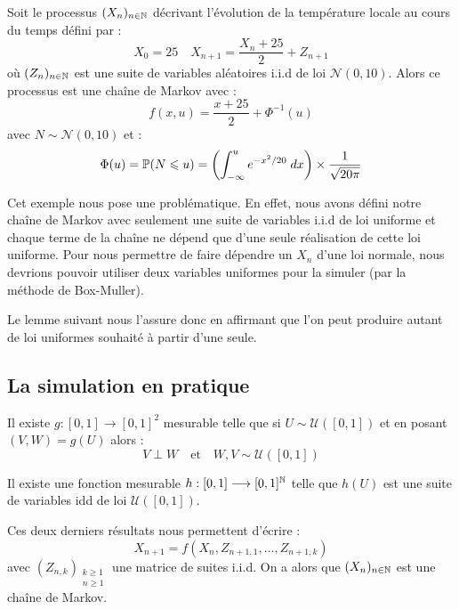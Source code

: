 \begin{example}
    Soit le processus $(X_n)_{n \in \mathbb{N}}$ décrivant l'évolution de la température locale au cours du temps défini par : 
        $$ X_0 = 25 \quad X_{n+1} = \frac{X_n + 25}{2} + Z_{n+1} $$
    où $(Z_n)_{n \in \mathbb{N}}$ est une suite de variables aléatoires i.i.d de loi $ \mathcal{N}(0, 10)$. 
    Alors ce processus est une chaîne de Markov avec : 
        $$ f(x,u) = \frac{x + 25}{2} + \Phi^{-1}(u) $$  
    avec $N \sim \mathcal{N}(0, 10)$ et : 
        \begin{align*}
            \Phi(u) = \mathbb{P}(N \leqslant u) = \left( \int_{- \infty}^{u} e^{- x^2 / 20} \; dx\right) \times \frac{1}{\sqrt{20 \pi}}   
        \end{align*}
\end{example}

\begin{remark}
    Cet exemple nous pose une problématique. En effet, nous avons défini notre chaîne de Markov avec seulement 
    une suite de variables i.i.d de loi uniforme et chaque terme de la chaîne ne dépend que d'une seule 
    réalisation de cette loi uniforme. Pour nous permettre de faire dépendre un $X_n$ d'une loi normale, 
    nous devrions pouvoir utiliser deux variables uniformes pour la simuler (par la méthode de Box-Muller). 
\end{remark}

Le lemme suivant nous l'assure donc en affirmant que l'on peut produire autant de loi uniformes 
souhaité à partir d'une seule. 

\subsection{La simulation en pratique}

\begin{lemma}
    Il existe $g : [0,1] \longrightarrow [0,1]^2$ mesurable telle que si $ U \sim \mathcal{U}([0,1])$ 
    et en posant $(V, W) = g(U)$ alors : 
        $$ V \perp W \quad \text{et} \quad W,V \sim \mathcal{U}([0,1]) $$  
\end{lemma}

\begin{corollary}
    Il existe une fonction mesurable $h : [0,1] \longrightarrow [0,1]^{\mathbb{N}}$ telle que $h(U)$ 
    est une suite de variables idd de loi $ \mathcal{U}([0,1])$.  
\end{corollary}

\begin{remark}
    Ces deux derniers résultats nous permettent d'écrire : 
        $$ X_{n+1} = f(X_n, Z_{n+1, 1}, \dots, Z_{n+1, k}) $$ 
    avec $(Z_{n,k})_{\substack{k \geqslant 1 \\ n \geqslant 1}}$ une matrice de suites i.i.d. 
    On a alors que $(X_n)_{n \in \mathbb{N}}$ est une chaîne de Markov. 
\end{remark}


